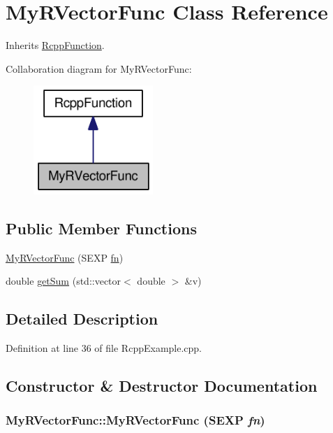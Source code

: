 \hypertarget{classMyRVectorFunc}{
\section{MyRVectorFunc Class Reference}
\label{classMyRVectorFunc}
}
Inherits \hyperlink{classRcppFunction}{RcppFunction}.

Collaboration diagram for MyRVectorFunc:\nopagebreak
\begin{figure}[H]
\begin{center}
\leavevmode
\includegraphics[width=128pt]{classMyRVectorFunc__coll__graph}
\end{center}
\end{figure}
\subsection*{Public Member Functions}
\begin{CompactItemize}
\item 
\hyperlink{classMyRVectorFunc_dc09bab76bddb0c246ed98c942fd4cd8}{MyRVectorFunc} (SEXP \hyperlink{classRcppFunction_a6b5966224b8b7d158be6cdfc3612063}{fn})
\item 
double \hyperlink{classMyRVectorFunc_2eba5a390ca620a687e77208bfbb6df4}{getSum} (std::vector$<$ double $>$ \&v)
\end{CompactItemize}


\subsection{Detailed Description}


Definition at line 36 of file RcppExample.cpp.

\subsection{Constructor \& Destructor Documentation}
\hypertarget{classMyRVectorFunc_dc09bab76bddb0c246ed98c942fd4cd8}{
\subsubsection[{MyRVectorFunc}]{\setlength{\rightskip}{0pt plus 5cm}MyRVectorFunc::MyRVectorFunc (SEXP {\em fn})}}
\label{classMyRVectorFunc_dc09bab76bddb0c246ed98c942fd4cd8}




